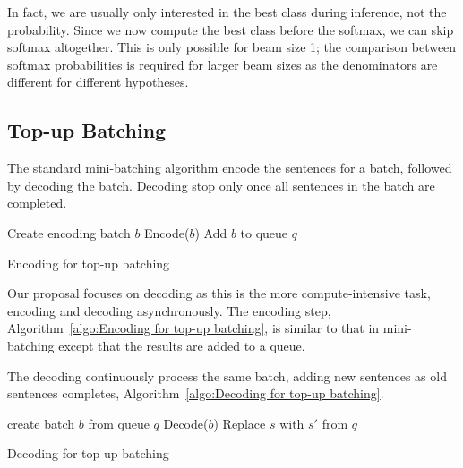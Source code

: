 \documentclass[11pt,a4paper]{article}
\begin{document}
In fact, we are usually only interested in the best class during inference, not the probability. Since we now compute the best class before the softmax, we can skip softmax altogether. This is only possible for beam size 1; the comparison between softmax probabilities is required for larger beam sizes as the denominators are different for different hypotheses.

\subsection{Top-up Batching}

The standard mini-batching algorithm encode the sentences for a batch, followed by decoding the batch. Decoding stop only once all sentences in the batch are completed.

\begin{algorithm}
\begin{algorithmic}
\small

  \State Create encoding batch $b$
  \State Encode($b$)
  \State Add $b$ to queue $q$
\EndWhile 

\EndProcedure

\end{algorithmic}
\caption{Encoding for top-up batching}
\label{algo:Encoding for top-up batching}
\end{algorithm}

Our proposal focuses on decoding as this is the more compute-intensive task, encoding and decoding asynchronously. The encoding step, Algorithm~\ref{algo:Encoding for top-up batching}, is similar to that in mini-batching except that the results are added to a queue.

The decoding continuously process the same batch, adding new sentences as old sentences completes, Algorithm~\ref{algo:Decoding for top-up batching}.

\begin{algorithm}
\begin{algorithmic}
\small


\State create batch $b$ from queue $q$
  \State Decode($b$)
      \State Replace $s$ with $s'$ from $q$
    \EndIf
  \EndFor
\EndWhile

\EndProcedure

\end{algorithmic}
\caption{Decoding for top-up batching}
\label{algo:Decoding for top-up batching}
\end{algorithm}
\end{document}

